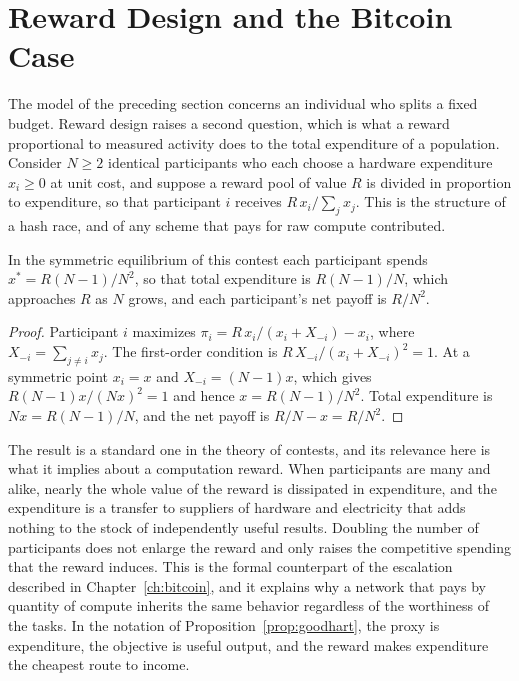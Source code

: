 \section{Reward Design and the Bitcoin Case}

The model of the preceding section concerns an individual who splits a fixed budget. Reward design raises a second question, which is what a reward proportional to measured activity does to the total expenditure of a population. Consider $N\ge 2$ identical participants who each choose a hardware expenditure $x_i\ge 0$ at unit cost, and suppose a reward pool of value $R$ is divided in proportion to expenditure, so that participant $i$ receives $R\,x_i/\sum_j x_j$. This is the structure of a hash race, and of any scheme that pays for raw compute contributed.

\begin{proposition}
\label{prop:escalation}
In the symmetric equilibrium of this contest each participant spends $x^{*}=R(N-1)/N^{2}$, so that total expenditure is $R(N-1)/N$, which approaches $R$ as $N$ grows, and each participant's net payoff is $R/N^{2}$.
\end{proposition}

\begin{proof}
Participant $i$ maximizes $\pi_i=R\,x_i/(x_i+X_{-i})-x_i$, where $X_{-i}=\sum_{j\ne i}x_j$. The first-order condition is $R\,X_{-i}/(x_i+X_{-i})^{2}=1$. At a symmetric point $x_i=x$ and $X_{-i}=(N-1)x$, which gives $R(N-1)x/(Nx)^{2}=1$ and hence $x=R(N-1)/N^{2}$. Total expenditure is $Nx=R(N-1)/N$, and the net payoff is $R/N-x=R/N^{2}$.
\end{proof}

The result is a standard one in the theory of contests, and its relevance here is what it implies about a computation reward. When participants are many and alike, nearly the whole value of the reward is dissipated in expenditure, and the expenditure is a transfer to suppliers of hardware and electricity that adds nothing to the stock of independently useful results. Doubling the number of participants does not enlarge the reward and only raises the competitive spending that the reward induces. This is the formal counterpart of the escalation described in Chapter~\ref{ch:bitcoin}, and it explains why a network that pays by quantity of compute inherits the same behavior regardless of the worthiness of the tasks. In the notation of Proposition~\ref{prop:goodhart}, the proxy is expenditure, the objective is useful output, and the reward makes expenditure the cheapest route to income.

